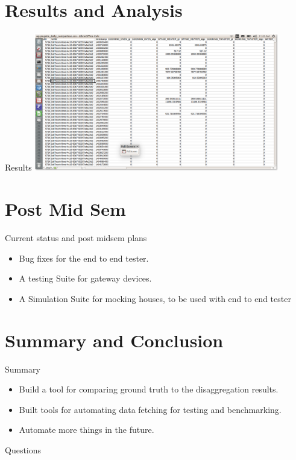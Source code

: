 \documentclass[xcolor=svgnames,handout]{beamer}
\begin{document}
    \section{Results and Analysis}
    \begin{frame}{Results}
      \includegraphics[width=0.8\textwidth]{aggregate}
    \end{frame}
    
    \section{Post Mid Sem}
    \begin{frame}{Current status and post midsem plans}
      \begin{itemize}
        \item Bug fixes for the end to end tester.
        \item A testing Suite for gateway devices.
        \item A Simulation Suite for mocking houses, to be used with
          end to end tester
      \end{itemize}

    \end{frame}
    
    \section
        {Summary and Conclusion}

        \begin{frame}
          {Summary}

          \begin{itemize}
          \item Build a tool for comparing ground truth to the
            disaggregation results.
          \item Built tools for automating data fetching for testing
            and benchmarking.
          \item Automate more things in the future.
          \end{itemize}
        \end{frame}


        \begin{frame}
          {Questions}
        \end{frame}
\end{document}
